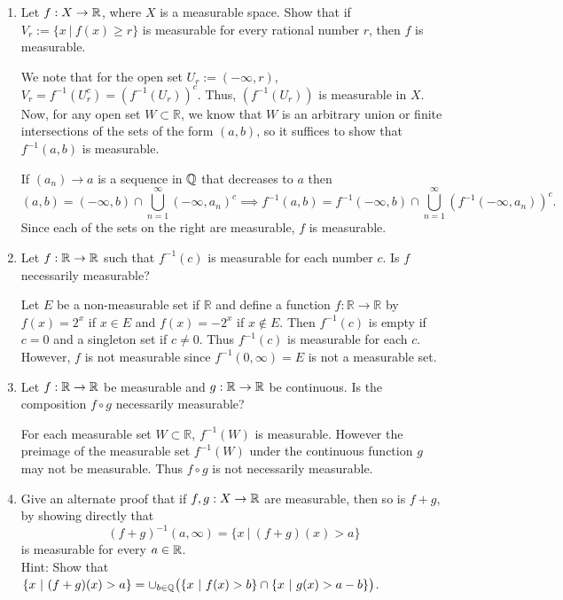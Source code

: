 \documentclass[12pt]{article}
\newcommand{\rl}{\mathbb{R}}
\begin{document}
\begin{enumerate}


\item Let $f: X \to \mathbb{R}$, where $X$ is a measurable space.
Show that if $V_r:=\{ x \ | \ f(x) \geq r \}$ is measurable for every rational number $r$, then $f$ is measurable.

\begin{mybox}

  We note that for the open set $U_r:=(-\infty,r)$, $V_r=f^{-1}
  (U_r^c)=(f^{-1}(U_r))^c$. Thus, $(f^{-1}(U_r))$ is measurable
  in $X$. Now, for any open set $W\subset \rl$, we know that
  $W$ is an arbitrary union or finite intersections
  of the sets of the form $(a,b)$, so it suffices to show
  that $f^{-1}(a,b)$ is measurable.

  \vspace*{2mm}
  If $(a_n)\to a$ is a sequence in $\mathbb{Q}$ that decreases to
  $a$ then
  $$(a,b)=(-\infty,b)\cap \bigcup_{n=1}^\infty{(-\infty,
  a_n)^c}\implies
  f^{-1}(a,b)=f^{-1}(-\infty,b)\cap \bigcup_{n=1}^\infty{
  (f^{-1}(-\infty,a_n))^c}.
  $$
  Since each of the sets on the right are measurable,
  $f$ is measurable.
\end{mybox}

\item Let $f:\mathbb{R} \to \mathbb{R}$ such that $f^{-1}(c)$ is
measurable for each number $c$. Is $f$ necessarily measurable?

\begin{mybox}
  Let $E$ be a non-measurable set if $\rl$ and define a
  function $f:\rl\to\rl$ by $f(x)=2^x$ if $x\in E$ and
  $f(x)=-2^x$ if $x\notin E$. Then $f^{-1}(c)$ is empty if
  $c=0$ and a singleton set if $c\neq 0$. Thus $f^{-1}(c)$
  is measurable for each $c$. However, $f$ is not measurable
  since $f^{-1}(0,\infty)=E$ is not a measurable set.
\end{mybox}

\item Let $f :\mathbb{R} \to \mathbb{R}$ be measurable and $g :\mathbb{R} \to \mathbb{R}$ be continuous. Is the composition $f \circ g$ 
necessarily measurable?

\begin{mybox}
  For each measurable set $W\subset\rl$,
  $f^{-1}(W)$ is measurable. However the preimage of the
  measurable set $f^{-1}(W)$ under the continuous 
  function $g$ may not be measurable. Thus $f\circ g$
  is not necessarily measurable.
\end{mybox}

\item Give an alternate proof that if $f, g: X \to \mathbb{R}$ are measurable, then so is $f+g$, by showing directly that 
$$ (f+g)^{-1}(a,\infty) = \{x \ | \ (f+g)(x) > a \}$$ 
is measurable for every $a \in \mathbb{R}$. \\
Hint: Show that $\ds \{x \ | \ (f+g)(x) > a \} = \cup_{b \in \mQ} \big( \{x \ | \ f(x) > b \} \cap \{ x \ | \ g(x) > a-b\} \big)$. 


\end{enumerate}
\end{document}
